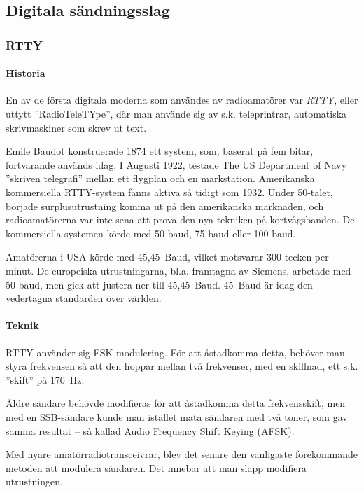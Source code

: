 \subsection{Digitala sändningsslag}

\subsubsection{RTTY}

\paragraph{Historia}

En av de första digitala moderna som användes av radioamatörer var \emph{RTTY},
eller uttytt ''RadioTeleTYpe'', där man använde sig av s.k. teleprintrar,
automatiska skrivmaskiner som skrev ut text.

Emile Baudot konstruerade 1874 ett system, som, baserat på fem bitar,
fortvarande används idag.
I Augusti 1922, testade The US Department of Navy ''skriven telegrafi'' mellan
ett flygplan och en markstation.
Amerikanska kommersiella RTTY-system fanns aktiva så tidigt som 1932.
Under 50-talet, började surplusutrustning komma ut på den amerikanska
marknaden, och radioamatörerna var inte sena att prova den nya tekniken på
kortvågsbanden.
De kommersiella systemen körde med 50 baud, 75 baud eller 100 baud.

Amatörerna i USA körde med 45,45~Baud, vilket motsvarar 300 tecken per minut.
De europeiska utrustningarna, bl.a. framtagna av Siemens, arbetade med 50 baud,
men gick att justera ner till 45,45~Baud.
45~Baud är idag den vedertagna standarden över världen.

\paragraph{Teknik}

RTTY använder sig FSK-modulering.
För att åstadkomma detta, behöver man styra frekvensen så att den hoppar mellan
två frekvenser, med en skillnad, ett s.k. ''skift'' på 170~Hz.

Äldre sändare behövde modifieras för att åstadkomma detta frekvensskift, men
med en SSB-sändare kunde man istället mata sändaren med två toner, som gav
samma resultat -- så kallad Audio Frequency Shift Keying (AFSK).

Med nyare amatörradiotransceivrar, blev det senare den vanligaste förekommande
metoden att modulera sändaren.
Det innebar att man slapp modifiera utrustningen.

